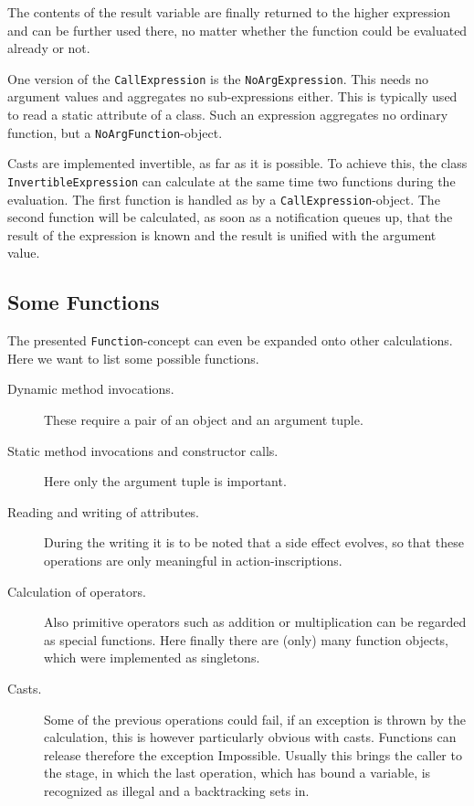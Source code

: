 The contents of the result variable are finally returned to the higher
expression and can be further used there, no matter whether the function
could be evaluated already or not.

One version of the \texttt{CallExpression} is the \texttt{NoArgExpression}.
This needs no argument values and aggregates no sub-expressions either.
This is typically used to read a static attribute of a class.
Such an expression aggregates no ordinary function, but a
\texttt{NoArgFunction}-object.

Casts are implemented invertible, as far as it is possible. 
To achieve this, the class \texttt{InvertibleExpression} can
calculate at the same time two functions during the evaluation. The first
function is handled as by a \texttt{CallExpression}-object.
The second function
will be calculated, as soon as a notification queues up, that the result
of the expression is known and the result is unified with the argument
value.


\subsection{Some Functions}

The presented \texttt{Function}-concept can even be expanded onto other
calculations. Here we want to list some possible functions.


\begin{description}
\item[Dynamic method invocations.] These require a pair of an object and an
argument tuple.

\item[Static method invocations and constructor calls.] Here only the argument
tuple is important.

\item[Reading and writing of attributes.] During the writing it is to be noted
that a side effect evolves, so that these operations are only meaningful
in action-inscriptions.

\item[Calculation of operators.] Also primitive operators such as addition or
multiplication can be regarded as special functions. Here finally there
are (only) many function objects, which were implemented as singletons.

\item[Casts.] Some of the previous operations could fail, if an exception is
thrown by the calculation, this is however particularly obvious with
casts. Functions can release therefore the exception Impossible. Usually
this brings the caller to the stage, in which the last operation, which
has bound a variable, is recognized as illegal and a backtracking sets in.
\end{description}

